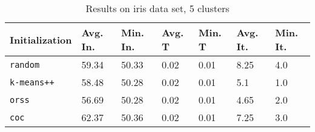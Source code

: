 \begin{table}[h]
	\begin{center}
		\begin{tabular}{|l|l|l|l|l|l|l|}
			\hline
			Initialization & Avg. In. & Min. In. & Avg. T & Min. T & Avg. It. & Min. It.\\\hline
			\texttt{random} & 59.34 & 50.33 & 0.02 & 0.01 & 8.25 & 4.0\\\hline
			\texttt{k-means++} & 58.48 & 50.28 & 0.02 & 0.01 & 5.1 & 1.0\\\hline
			\texttt{orss} & 56.69 & 50.28 & 0.02 & 0.01 & 4.65 & 2.0\\\hline
			\texttt{coc} & 62.37 & 50.36 & 0.02 & 0.01 & 7.25 & 3.0\\\hline
		\end{tabular}
		\caption{Results on iris data set, 5 clusters}
		\label{tbl:iris5}
	\end{center}
\end{table}


